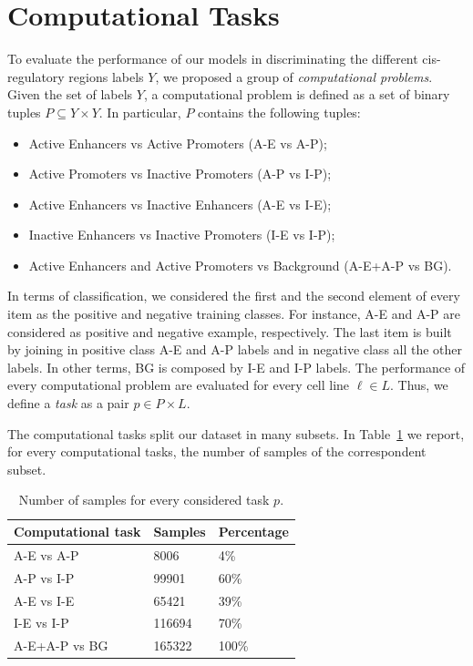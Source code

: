 \section{Computational Tasks} \label{sec:computational_tasks}
To evaluate the performance of our models in discriminating the different cis-regulatory regions labels $Y$, we proposed a group of \emph{computational problems}. Given the set of labels $Y$, a computational problem is defined as a set of binary tuples $P \subseteq Y \times Y$. In particular, $P$ contains the following tuples: 
\begin{itemize}
    \item Active Enhancers vs Active Promoters (A-E vs A-P);
    \item Active Promoters vs Inactive Promoters (A-P vs I-P);
    \item Active Enhancers vs Inactive Enhancers (A-E vs I-E); 
    \item Inactive Enhancers vs Inactive Promoters (I-E vs I-P); 
    \item Active Enhancers and Active Promoters vs Background (A-E+A-P vs BG).
\end{itemize}
In terms of classification, we considered the first and the second element of every item as the positive and negative training classes. For instance, A-E and A-P are considered as positive and negative example, respectively. The last item is built by joining in positive class A-E and A-P labels and in negative class all the other labels. In other terms, BG is composed by I-E and I-P labels. The performance of every computational problem are evaluated for every cell line $\ell \in L$. Thus, we define a \emph{task} as a pair $p \in P \times L$. 

The computational tasks split our dataset in many subsets. In Table~\ref{tab:dataset_sample} we report, for every computational tasks, the number of samples of the correspondent subset. 

\begin{table}[h]
\centering
\begin{tabular}{lll}
\toprule
Computational task & Samples  & Percentage \\ 
\midrule
A-E vs A-P & 8006   & 4\%  \\ 
A-P vs I-P & 99901 & 60\% \\ 
A-E vs I-E & 65421  & 39\%  \\ 
I-E vs I-P & 116694  & 70\% \\
A-E+A-P vs BG & 165322 & 100\% \\ 
\bottomrule
\end{tabular}
\caption{Number of samples for every considered task $p$.}
\label{tab:dataset_sample}
\end{table}



